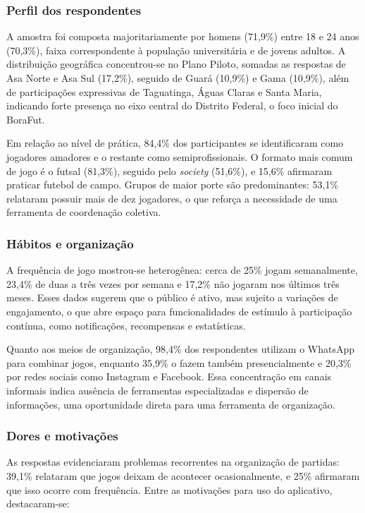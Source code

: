         \subsubsection*{Perfil dos respondentes}
        A amostra foi composta majoritariamente por homens (71,9\%) entre 18 e 24 anos (70,3\%), faixa correspondente à população universitária e de jovens adultos. A distribuição geográfica concentrou-se no Plano Piloto, somadas as respostas de Asa Norte e Asa Sul (17,2\%), seguido de Guará (10,9\%) e Gama (10,9\%), além de participações expressivas de Taguatinga, Águas Claras e Santa Maria, indicando forte presença no eixo central do Distrito Federal, o foco inicial do BoraFut.

        Em relação ao nível de prática, 84,4\% dos participantes se identificaram como jogadores amadores e o restante como semiprofissionais. O formato mais comum de jogo é o futsal (81,3\%), seguido pelo \textit{society} (51,6\%), e 15,6\% afirmaram praticar futebol de campo. Grupos de maior porte são predominantes: 53,1\% relataram possuir mais de dez jogadores, o que reforça a necessidade de uma ferramenta de coordenação coletiva.

        \subsubsection*{Hábitos e organização}
        A frequência de jogo mostrou-se heterogênea: cerca de 25\% jogam semanalmente, 23,4\% de duas a três vezes por semana e 17,2\% não jogaram nos últimos três meses. Esses dados sugerem que o público é ativo, mas sujeito a variações de engajamento, o que abre espaço para funcionalidades de estímulo à participação contínua, como notificações, recompensas e estatísticas.

        Quanto aos meios de organização, 98,4\% dos respondentes utilizam o WhatsApp para combinar jogos, enquanto 35,9\% o fazem também presencialmente e 20,3\% por redes sociais como Instagram e Facebook. Essa concentração em canais informais indica ausência de ferramentas especializadas e dispersão de informações, uma oportunidade direta para uma ferramenta de organização.

        \subsubsection*{Dores e motivações}
        As respostas evidenciaram problemas recorrentes na organização de partidas: 39,1\% relataram que jogos deixam de acontecer ocasionalmente, e 25\% afirmaram que isso ocorre com frequência. Entre as motivações para uso do aplicativo, destacaram-se:

